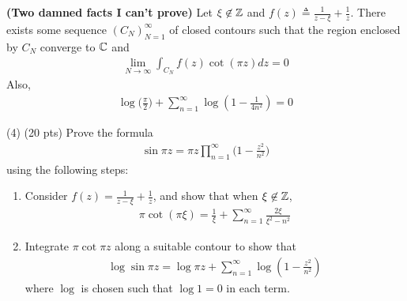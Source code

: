 \documentclass{report}
\begin{document}
\begin{theorem}
\label{IoD}
\textbf{(Two damned facts I can't prove)}  Let $\xi \not\in\mathbb{Z}$  and $f(z)\triangleq  \frac{1}{z-\xi}+ \frac{1}{z}$. There exists some sequence $(C_N)_{N=1}^{\infty}$ of closed contours such that the region enclosed by $C_N$ converge to  $\mathbb{C}$ and 
\begin{align*}
\lim_{N\to \infty} \int_{C_N}f(z)\cot (\pi  z)dz=0
\end{align*}
Also, 
\begin{align*}
\log \Big(\frac{\pi }{2} \Big)+ \sum_{n=1}^{\infty} \log (1- \frac{1}{4n^2})=0
\end{align*}
\end{theorem}
\begin{question}{}{}
(4) (20 pts) Prove the formula 
\begin{align*}
\sin \pi  z= \pi  z \prod _{n=1}^{\infty} \Big( 1-\frac{z^2}{n^2} \Big)
\end{align*}
using the following steps: 
\begin{enumerate}[label=(\alph*)]
  \item Consider $f(z)= \frac{1}{z- \xi}+ \frac{1}{z}$, and show that when $\xi \not\in\mathbb{Z}$, 
    \begin{align*}
    \pi  \cot (\pi  \xi)= \frac{1}{\xi}+ \sum_{n=1}^{\infty} \frac{2\xi}{\xi^2- n^2}
    \end{align*} 
    \item Integrate $\pi  \cot \pi z$ along a suitable contour to show that 
      \begin{align*}
      \log \sin \pi z= \log \pi z + \sum_{n=1}^{\infty} \log (1-\frac{z^2}{n^2})
      \end{align*}
      where $\log$ is chosen such that $\log 1=0$ in each term. 
\end{enumerate}
\end{question}
\end{document}
